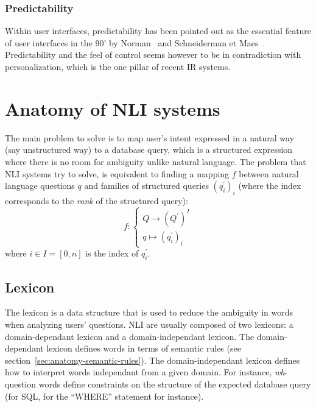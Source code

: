 \documentclass[10pt,journal,letterpaper,compsoc]{IEEEtran}
\begin{document}
\subsubsection{Predictability}
Within user interfaces, predictability has been pointed out as the essential
feature of user interfaces in the 90' by
Norman~\cite{Norman:1994:MPI:176789.176796} and Schneiderman et
Maes~\cite{Shneiderman:1997:DMV:267505.267514}. 
Predictability and the feel of control seems however to be in contradiction with
personalization, which is the one pillar of recent IR systems. 
















\section{Anatomy of NLI systems}
\label{sec:anatomy}
The main problem to solve is to map user's intent expressed in a natural way
(say unstructured way) to a database query, which is a structured expression
where there is no room for ambiguity unlike natural language. The problem that
NLI systems try to solve, is equivalent to finding a mapping $f$ between natural
language questions $q$ and families of structured queries $(q^\prime_i)_i$
(where the index corresponds to the \emph{rank} of the structured query):
\begin{equation}
f:\left\{
\begin{array}{l}
Q\rightarrow (Q^\prime)^I\\
q\mapsto(q^\prime_i)_i
\end{array}\right.
\end{equation}
where $i\in I=[0,n]$ is the index of $q^\prime_i$.
 


\subsection{Lexicon}
The lexicon is a data structure that is used to reduce the ambiguity in words
when analyzing users' questions. 
NLI are usually composed of two lexicons: a domain-dependant lexicon and a
domain-independant lexicon. 
The domain-dependant lexicon defines words in terms of semantic rules (see
section~\ref{sec:anatomy-semantic-rules}).
The domain-independant lexicon defines how to interpret words independant from a
given domain. For instance, {\it wh}-question words define constraints on the
structure of the expected database query (for SQL, for the ``WHERE'' statement
for instance). 
\end{document}
